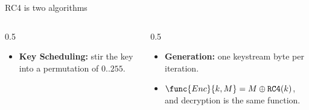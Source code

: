 \ifdefined\PRESENTATION\else\PassOptionsToClass{handout}{beamer}\fi\documentclass[aspectratio=169, lualatex]{beamer}
\begin{document}
\begin{frame}{RC4 is two algorithms}
	\begin{columns}[t]
		\begin{column}{0.5\textwidth}
			\begin{center}
			\end{center}
			\begin{itemize}
				\item \textbf{Key Scheduling:} stir the key into a permutation of $0..255$.
			\end{itemize}
		\end{column}
		\begin{column}{0.5\textwidth}
			\begin{center}
			\end{center}
			\begin{itemize}
				\item \textbf{Generation:} one keystream byte per iteration.
				\item $\func{Enc}{k, M} = M \oplus \texttt{RC4}(k)$, and decryption is the same function.
			\end{itemize}
		\end{column}
	\end{columns}
\end{frame}
\end{document}
